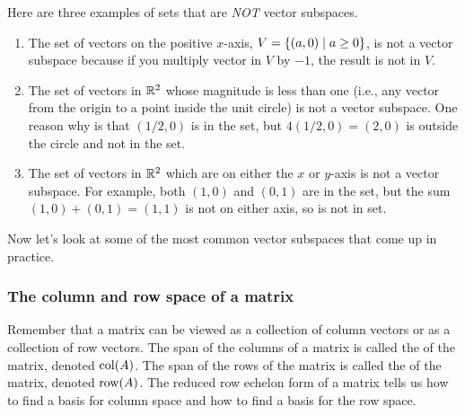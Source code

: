 \begin{example}
Here are three examples of sets that are \emph{NOT} vector subspaces.
\begin{enumerate}
	\item The set of vectors on the positive $x$-axis, $V=\{(a,0)\mid a\geq0\}$, is not a vector subspace because if you multiply vector in $V$ by $-1$, the result is not in $V$.
	\item The set of vectors in $\mathbb{R}^2$ whose magnitude is less than one (i.e., any vector from the origin to a point inside the unit circle) is not a vector subspace.  One reason why is that $(1/2,0)$ is in the set, but $4(1/2,0)=(2,0)$ is outside the circle and not in the set.  
	\item The set of vectors in $\mathbb{R}^2$ which are on either the $x$ or $y$-axis is not a vector subspace. For example, both $(1,0)$ and $(0,1)$ are in the set, but the sum $(1,0)+(0,1) = (1,1)$ is not on either axis, so is not in set.
\end{enumerate}
\end{example}

Now let's look at some of the most common vector subspaces that come up in practice.

\subsubsection{The column and row space of a matrix}
Remember that a matrix can be viewed as a collection of column vectors or as a collection of row vectors.  The span of the columns of a matrix is called the  of the matrix, denoted $\operatorname{col}(A)$.  The span of the rows of the matrix is called the  of the matrix, denoted $\operatorname{row}(A)$.  The reduced row echelon form of a matrix tells us how to find a basis for column space and how to find a basis for the row space.  


